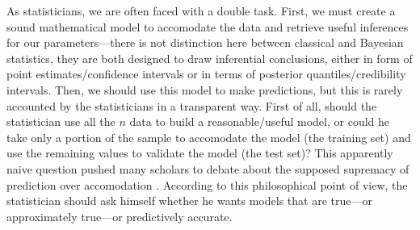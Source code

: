 \documentclass{statsoc}
\begin{document}
As statisticians, we are often faced with a double task. First, we must create a sound mathematical model to accomodate the data and retrieve useful inferences for our 
parameters---there is not distinction here between classical and Bayesian statistics, they are both designed to draw inferential conclusions, either in form of point estimates/confidence intervals or in terms of posterior quantiles/credibility intervals. Then, we should use this model to make predictions, but this is rarely accounted by the statisticians in a transparent way.
%
%
%
First of all, should the statistician use all the $n$ data to build a reasonable/useful model, or could he take only a portion of the 
sample to accomodate the model (the training set) and use the remaining values to validate the model (the test set)? This apparently naive question pushed many scholars to debate 
about the supposed supremacy of prediction over accomodation \citep{maher1988prediction, hitchcock2004prediction, worrall2014prediction}. According to this philosophical point of view, the 
statistician should ask himself whether he wants models that are true---or  approximately true---or predictively accurate. 
\end{document}
